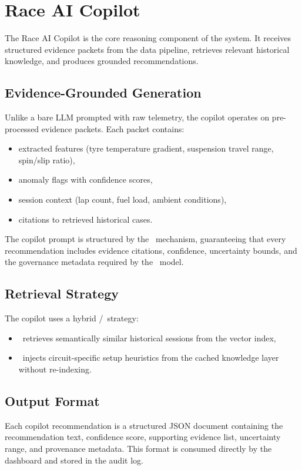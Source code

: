 \section{Race AI Copilot}
\label{sec:copilot}

The Race AI Copilot is the core reasoning component of the system. It receives
structured evidence packets from the data pipeline, retrieves relevant historical
knowledge, and produces grounded recommendations.

\subsection{Evidence-Grounded Generation}

Unlike a bare LLM prompted with raw telemetry, the copilot operates on
pre-processed evidence packets. Each packet contains:

\begin{itemize}
  \item extracted features (tyre temperature gradient, suspension travel range,
    spin/slip ratio),
  \item anomaly flags with confidence scores,
  \item session context (lap count, fuel load, ambient conditions),
  \item citations to retrieved historical cases.
\end{itemize}

The copilot prompt is structured by the \sdd~mechanism, guaranteeing that every
recommendation includes evidence citations, confidence, uncertainty bounds, and
the governance metadata required by the \kdd~model.

\subsection{Retrieval Strategy}

The copilot uses a hybrid \rag/\cag~strategy:

\begin{itemize}
  \item \rag~retrieves semantically similar historical sessions from the vector
    index,
  \item \cag~injects circuit-specific setup heuristics from the cached knowledge
    layer without re-indexing.
\end{itemize}

\subsection{Output Format}

Each copilot recommendation is a structured JSON document containing the
recommendation text, confidence score, supporting evidence list, uncertainty
range, and provenance metadata. This format is consumed directly by the \rcc~
dashboard and stored in the audit log.

